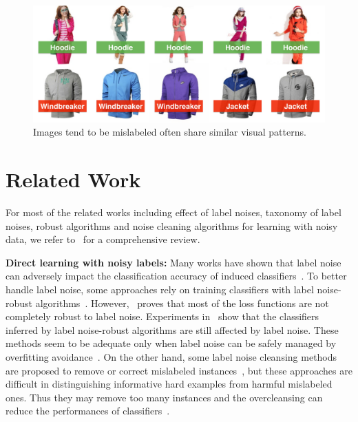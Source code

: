 \documentclass[10pt,twocolumn,letterpaper]{article}
\begin{document}
\begin{figure}[t]
\begin{center}
\includegraphics[width=1.0\linewidth]{figure/noise_cluster.pdf}
\end{center}
\caption{Images tend to be mislabeled often share similar visual patterns.}
\label{fig:noise_cluster}
\end{figure}

\section{Related Work} %
\label{sec:related_work}
For most of the related works including effect of label noises, taxonomy of label noises, robust algorithms and noise cleaning algorithms for learning with noisy data, we refer to~\cite{frenay2013classification} for a comprehensive review. 

{\bf Direct learning with noisy labels:} Many works have shown that label noise can adversely impact the classification accuracy of induced classifiers~\cite{zhu2004class}. To better handle label noise, some approaches rely on training classifiers with label noise-robust algorithms~\cite{beigman2009learning,manwani2013noise}. However,~\cite{bartlett2006convexity} proves that most of the loss functions are not completely robust to label noise. Experiments in~\cite{teng2001comparison} show that the classifiers inferred by label noise-robust algorithms are still affected by label noise. These methods seem to be adequate only when label noise can be safely managed by overfitting avoidance~\cite{frenay2013classification}. On the other hand, some label noise cleansing methods are proposed to remove or correct mislabeled instances~\cite{barandela2000decontamination,brodley2011identifying,miranda2009use}, but these approaches are difficult in distinguishing informative hard examples from harmful mislabeled ones. Thus they may remove too many instances and the overcleansing can reduce the performances of classifiers~\cite{matic1992computer}.
\end{document}
